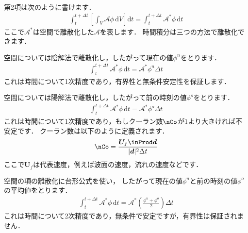 第2項は次のように書けます．
\begin{align}
 \label{eq:2.32}
 \int_{t}^{t + \Delta t}\left[\int_{V}\mathcal{A}\phi\,\mathrm{d}V\right]\mathrm{d}t
 = \int_{t}^{t + \Delta t}\mathcal{A}^{*}\phi\,\mathrm{d}t
\end{align}
ここで$\mathcal{A}^{*}$は空間で離散化した$\mathcal{A}$を表します．
時間積分は三つの方法で離散化できます．
\begin{description}
%  
 \item[オイラー陰解法] 空間については陰解法で離散化し，したがって現在の値$\phi^{n}$をとります．
            \begin{align}
             \label{eq:2.33}
             \int_{t}^{t + \Delta t}\mathcal{A}^{*}\phi\,\mathrm{d}t
             = \mathcal{A}^{*}\phi^{n}\Delta t
            \end{align}
            これは時間について1次精度であり，有界性と無条件安定性を保証します．
%  
%  
 \item[陽解法] 空間については陽解法で離散化し，したがって前の時刻の値$\phi^{o}$をとります．
            \begin{align}
             \label{eq:2.34}
             \int_{t}^{t + \Delta t}\mathcal{A}^{*}\phi\,\mathrm{d}t
             = \mathcal{A}^{*}\phi^{o}\Delta t
            \end{align}
            これは時間について1次精度であり，もしクーラン数$\nCo$が$1$より大きければ不安定です．
%              
クーラン数は以下のように定義されます．
            \begin{align}
             \label{eq:2.35}
             \nCo = \frac{\bm{U}_{f} \inProd \bm{d}}{|\bm{d}|^{2}\Delta t}
            \end{align}
            ここで$\bm{U}_{f}$は代表速度，例えば波面の速度，流れの速度などです．
 \item[クランク・ニコルソン法]
%  
%  
%  
 空間の項の離散化に台形公式を使い，
            したがって現在の値$\phi^{n}$と前の時刻の値$\phi^{o}$の平均値をとります．
            \begin{align}
             \label{eq:2.36}
             \int_{t}^{t + \Delta t}\mathcal{A}^{*}\phi\,\mathrm{d}t
             = \mathcal{A}^{*}\left(\frac{\phi^{n} + \phi^{o}}{2}\right)\Delta t
            \end{align}
            これは時間について2次精度であり，無条件で安定ですが，有界性は保証されません．
\end{description}


